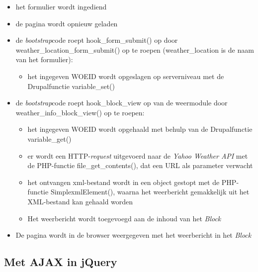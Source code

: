 \begin{itemize}
	\item het formulier wordt ingediend
	\item de pagina wordt opnieuw geladen
	\item de \textit{bootstrap}code roept hook\_form\_submit() op door weather\_location\_form\_submit() op te roepen (weather\_location is de naam van het formulier):
	\begin{itemize}
		\item het ingegeven WOEID wordt opgeslagen op serverniveau met de Drupalfunctie variable\_set()
	\end{itemize}
	\item de \textit{bootstrap}code roept hook\_block\_view op van de weermodule door weather\_info\_block\_view() op te roepen:
	\begin{itemize}
		\item het ingegeven WOEID wordt opgehaald met behulp van de Drupalfunctie variable\_get()
		\item er wordt een HTTP-\textit{request} uitgevoerd naar de \textit{Yahoo Weather API} met de PHP-functie file\_get\_contents(), dat een URL als parameter verwacht
		\item het ontvangen xml-bestand wordt in een object gestopt met de PHP-functie SimplexmlElement(), waarna het weerbericht gemakkelijk uit het XML-bestand kan gehaald worden
		\item Het weerbericht wordt toegevoegd aan de inhoud van het \textit{Block}
	\end{itemize}
	\item De pagina wordt in de browser weergegeven met het weerbericht in het \textit{Block}
\end{itemize}

\subsection{Met AJAX in jQuery}

